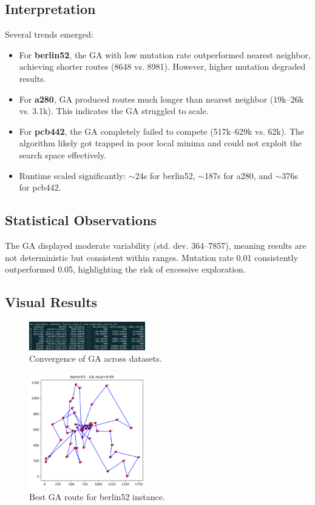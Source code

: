 \documentclass[conference]{IEEEtran}
\begin{document}
\subsection{Interpretation}
Several trends emerged:
\begin{itemize}
    \item For \textbf{berlin52}, the GA with low mutation rate outperformed nearest neighbor, achieving shorter routes (8648 vs. 8981). However, higher mutation degraded results.
    \item For \textbf{a280}, GA produced routes much longer than nearest neighbor (19k–26k vs. 3.1k). This indicates the GA struggled to scale.
    \item For \textbf{pcb442}, the GA completely failed to compete (517k–629k vs. 62k). The algorithm likely got trapped in poor local minima and could not exploit the search space effectively.
    \item Runtime scaled significantly: $\sim$24s for berlin52, $\sim$187s for a280, and $\sim$376s for pcb442.
\end{itemize}

\subsection{Statistical Observations}
The GA displayed moderate variability (std. dev. 364–7857), meaning results are not deterministic but consistent within ranges. Mutation rate 0.01 consistently outperformed 0.05, highlighting the risk of excessive exploration.

\subsection{Visual Results}
\begin{figure}[h]
    \centering
    \includegraphics[width=0.45\textwidth]{figures/group_data.png}
    \caption{Convergence of GA across datasets.}
    \label{fig:convergence}
\end{figure}

\begin{figure}[h]
    \centering
    \includegraphics[width=0.45\textwidth]{figures/berlin52_ga_mut0.05.png}
    \caption{Best GA route for berlin52 instance.}
    \label{fig:route52}
\end{figure}
\end{document}
